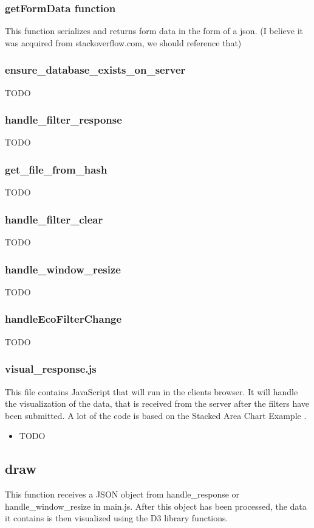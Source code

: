 \documentclass{article}
\begin{document}
\subsubsection*{getFormData function}
This function serializes and returns form data in the form of a json.
(I believe it was acquired from stackoverflow.com, we should reference that)

\subsubsection*{ensure\_database\_exists\_on\_server}
TODO

\subsubsection*{handle\_filter\_response}
TODO

\subsubsection*{get\_file\_from\_hash}
TODO

\subsubsection*{handle\_filter\_clear}
TODO

\subsubsection*{handle\_window\_resize}
TODO

\subsubsection*{handleEcoFilterChange}
TODO

\subsubsection{visual\_response.js}
This file contains JavaScript that will run in the clients browser. It
will handle the visualization of the data, that is received from the server
after
the filters have been submitted. A lot of the code is based on the Stacked Area
Chart Example \cite{d3}.
\begin{itemize}
	\item TODO
\end{itemize}
\subsection*{draw}
This function receives a JSON object from handle\_response or
handle\_window\_resize in main.js. After this object has
been processed, the data it contains is then visualized using the D3
library functions.
\end{document}
